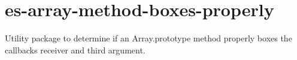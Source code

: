 \chapter{es-\/array-\/method-\/boxes-\/properly}
\hypertarget{md_node__modules_2es-array-method-boxes-properly_2README}{}\label{md_node__modules_2es-array-method-boxes-properly_2README}
\label{md_node__modules_2es-array-method-boxes-properly_2README_autotoc_md9993}%
%
 Utility package to determine if an {\ttfamily Array.\+prototype} method properly boxes the callback\textquotesingle{}s receiver and third argument. 